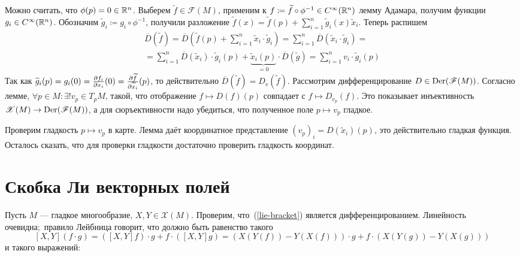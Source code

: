 \documentclass[a4paper]{report}
\begin{document}
{{{         Можно считать, что $\phi(p) = 0 \in \mathbb{R}^n$.
         Выберем $\tilde{f} \in \mathscr{F}(M)$, применим к $f \coloneqq \widetilde{f} \circ \phi^{-1} \in C^{\infty}(\mathbb{R}^n)$ лемму Адамара, получим функции $g_i \in C^{\infty}(\mathbb{R}^n)$.
         Обозначим $\tilde{g}_i \coloneqq g_i \circ \phi^{-1}$, получили разложение $\tilde{f}(x) = \tilde{f}(p) + \sum\limits_{i = 1}^{n}\tilde{g}_i(x)\tilde{x}_i$.
         Теперь распишем \begin{multline*}\overline{D}\left(\tilde{f}\right) = \overline{D}\left(\tilde{f}(p) + \sum\limits_{i=1}^{n}\tilde{x}_i \cdot \tilde{g}_i\right) = \sum\limits_{i=1}^{n}\overline{D}\left(\tilde{x}_i \cdot \tilde{g}_i\right) =\\= \sum\limits_{i=1}^{n}\overline{D}\left(\tilde{x}_i\right) \cdot \tilde{g}_i(p) + \underbrace{\tilde{x}_i(p)}_{=0} \cdot \overline{D}\left(\tilde{g}\right) = \sum\limits_{i = 1}^{n} v_i \cdot \tilde{g}_i(p)\end{multline*}
         Так как $\widetilde g_i(p) = g_i(0) = \frac{\partial f_i}{\partial x_i}(0) = \frac{\partial \widetilde f}{\partial \widetilde x_i}(p)$, то действительно $\overline{D}(\tilde{f}) = D_v(\tilde{f})$.
        }
    Рассмотрим дифференцирование $D \in \operatorname{Der}(\mathscr{F}(M))$.
        Согласно лемме, $\forall p \in M: \exists !v_p \in T_p M$, такой, что отображение $f \mapsto D(f)(p)$ совпадает с $f \mapsto D_{v_p}(f)$.
    Это показывает инъективность $\mathscr{X}(M) \rightarrow \operatorname{Der}(\mathscr{F}(M))$, а для сюръективности надо убедиться, что полученное поле $p \mapsto v_p$ гладкое.

    Проверим гладкость $p \mapsto v_p$ в карте.
        Лемма даёт координатное представление $(v_p)_i = D(\tilde{x}_i)(p)$, это действительно гладкая функция.
    Осталось сказать, что для проверки гладкости достаточно проверить гладкость координат.
    }
    }
    \section{Скобка Ли векторных полей}
    Пусть $M$ --- гладкое многообразие, $X, Y \in \mathscr{X}(M)$.
    Проверим, что~(\ref{lie-bracket}) является дифференцированием.
    Линейность очевидна;\ правило Лейбница говорит, что должно быть равенство такого
    \[[X, Y](f \cdot g) = ([X, Y]f) \cdot g + f \cdot ([X, Y]g) = (X(Y(f)) - Y(X(f))) \cdot g + f \cdot (X(Y(g)) - Y(X(g)))\]
    и такого выражений:
\end{document}
